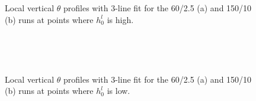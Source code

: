 \begin{figure}[htbp]
\begin{minipage}[b]{0.5\linewidth}
        \\
        \end{minipage}             
\quad
\begin{minipage}[b]{0.5\linewidth}
        \\
       
       \end{minipage}
        \caption[High local \acs{ML}]{Local vertical $\theta$ profiles with 3-line fit for the 60/2.5 (a) and 150/10 (b) runs at 
points where $h^{l}_{0}$ is high.}
        \label{fig:rssfitshigh}
\end{figure}

\begin{figure}[htbp]
\begin{minipage}[b]{0.5\linewidth}
        \\
        \end{minipage}             
\quad
\begin{minipage}[b]{0.5\linewidth}
        \\
       
       \end{minipage}
        \caption[Low local \acs{ML}]{Local vertical $\theta$ profiles with 3-line fit for the 60/2.5 (a) and 150/10 (b) runs at 
points where $h^{l}_{0}$ is low.}
        \label{fig:rssfitslow}
\end{figure}

